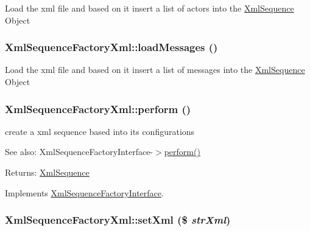 Load the xml file and based on it insert a list of actors into the \hyperlink{class_xml_sequence}{XmlSequence} Object \hypertarget{class_xml_sequence_factory_xml_7b848e420882e9f8fd28979953f32f84}{
\subsubsection[{loadMessages}]{\setlength{\rightskip}{0pt plus 5cm}XmlSequenceFactoryXml::loadMessages ()}}
\label{class_xml_sequence_factory_xml_7b848e420882e9f8fd28979953f32f84}


Load the xml file and based on it insert a list of messages into the \hyperlink{class_xml_sequence}{XmlSequence} Object \hypertarget{class_xml_sequence_factory_xml_f9deb0d1efc6f6e726837251a5759bcc}{
\subsubsection[{perform}]{\setlength{\rightskip}{0pt plus 5cm}XmlSequenceFactoryXml::perform ()}}
\label{class_xml_sequence_factory_xml_f9deb0d1efc6f6e726837251a5759bcc}


create a xml sequence based into its configurations

\begin{Desc}
\item[See also:]XmlSequenceFactoryInterface-$>$\hyperlink{class_xml_sequence_factory_xml_f9deb0d1efc6f6e726837251a5759bcc}{perform()} \end{Desc}
\begin{Desc}
\item[Returns:]\hyperlink{class_xml_sequence}{XmlSequence} \end{Desc}


Implements \hyperlink{interface_xml_sequence_factory_interface_c06f18d6c688317b41477c315f7008f7}{XmlSequenceFactoryInterface}.\hypertarget{class_xml_sequence_factory_xml_fcd133077830c5da893545402a045ddc}{
\subsubsection[{setXml}]{\setlength{\rightskip}{0pt plus 5cm}XmlSequenceFactoryXml::setXml (\$ {\em strXml})}}
\label{class_xml_sequence_factory_xml_fcd133077830c5da893545402a045ddc}


